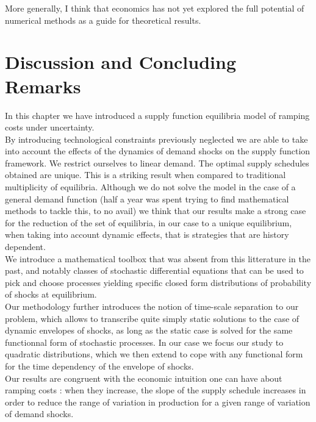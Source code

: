 More generally, I think that economics has not yet explored the full potential of numerical methods as a guide for theoretical results.  

\section{Discussion and Concluding Remarks}\label{ccl}

In this chapter we have introduced a supply function equilibria model of ramping costs under uncertainty.\\

By introducing technological constraints previously neglected we are able to take into account the effects of the dynamics of demand shocks on the supply function framework. We restrict ourselves to linear demand. The optimal supply schedules obtained are unique. This is a striking result when compared to traditional multiplicity of equilibria. Although we do not solve the model in the case of a general demand function (half a year was spent trying to find mathematical methods to tackle this, to no avail) we think that our results make a strong case for the reduction of the set of equilibria, in our case to a unique equilibrium, when taking into account dynamic effects, that is strategies that are history dependent. \\

We introduce a mathematical toolbox that was absent from this litterature in the past, and notably classes of stochastic differential equations that can be used to pick and choose processes yielding specific closed form distributions of probability of shocks at equilibrium. \\

Our methodology further introduces the notion of time-scale separation to our problem, which allows to transcribe quite simply static solutions to the case of dynamic envelopes of shocks, as long as the static case is solved for the same functionnal form of stochastic processes. In our case we focus our study to quadratic distributions, which we then extend to cope with any functional form for the time dependency of the envelope of shocks.\\

Our results are congruent with the economic intuition one can have about ramping costs : when they increase, the slope of the supply schedule increases in order to reduce the range of variation in production for a given range of variation of demand shocks.\\

